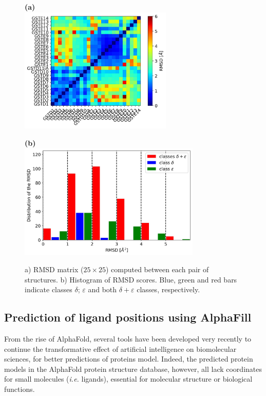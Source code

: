\begin{figure}[h!]
	\label{AlphaFold RMSD}
	\begin{minipage}{.48\linewidth}
		\textbf{(a)}\\
		\centering
		\includegraphics[height = 6cm]{figures/RMSD_matrix.jpg}
	\end{minipage}
	\begin{minipage}{.48\linewidth}
		\textbf{(b)}\\
		\centering
		\includegraphics[height = 5.5cm]{figures/RMSD_Proba.jpg}
		\vspace{.15cm}
	\end{minipage}
	\caption{a) RMSD matrix ($25\times 25$) computed between each pair of structures. b) Histogram of RMSD scores. Blue, green and red bars indicate classes $\delta$; $\varepsilon$ and both $\delta+\varepsilon$ classes, respectively.}
\end{figure}

\subsection{Prediction of ligand positions using AlphaFill}
From the rise of AlphaFold, several tools have been developed very recently to continue the transformative effect of artificial intelligence on biomolecular sciences, for better predictions of proteins model. Indeed, the predicted protein models in the AlphaFold protein structure database, however, all lack coordinates for small molecules (\textit{i.e.} ligands), essential for molecular structure or biological functions.

